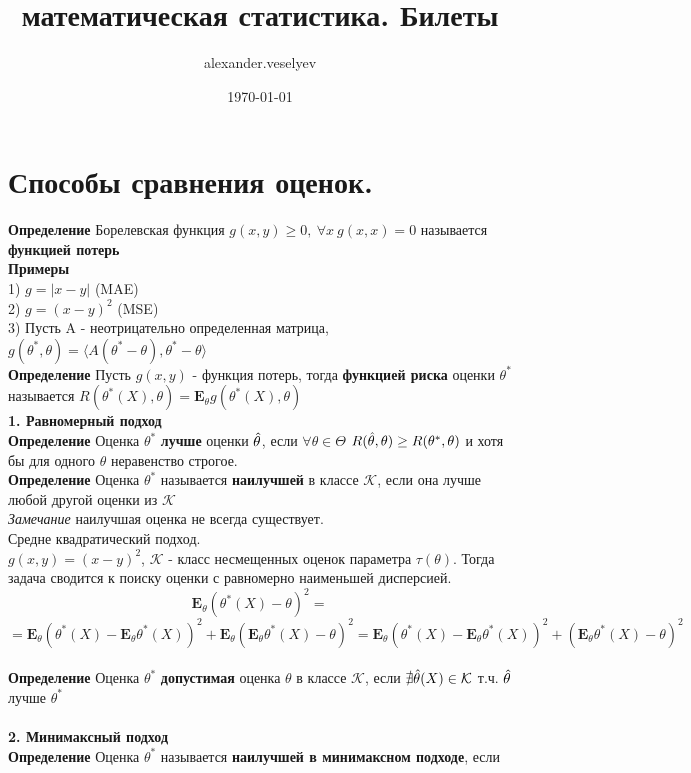 \documentclass[25pt]{article}
\title{математическая статистика. Билеты}
\author{alexander.veselyev }
\date{\today}
\begin{document}
\section{Способы сравнения оценок.}
\textbf{Определение} Борелевская функция $g(x,y) \geq 0,\ \forall x\ g(x,x) = 0$ называется \textbf{функцией потерь}\\
\textbf{Примеры}\\
1) $g = |x - y|$ (MAE)\\
2) $g = (x - y)^2$ (MSE)\\
3) Пусть A - неотрицательно определенная матрица,\\ $g(\theta^*, \theta) = \langle A(\theta^* - \theta), \theta^* - \theta\rangle$\\
\textbf{Определение} Пусть $g(x,y)$ - функция потерь, тогда \textbf{функцией риска} оценки $\theta^*$ называется $R(\theta^*(X), \theta) = \textbf{E}_\theta g(\theta^*(X),\theta)$\\
\textbf{1. Равномерный подход}\\
\textbf{Определение} Оценка $\theta^*$ \textbf{лучше} оценки $\Hat{\theta}$, если $\forall \theta\in\Theta$ $R(\Hat{\theta},\theta) \geq R(\theta^*,\theta)$ и хотя бы для одного $\theta$ неравенство строгое.\\
\textbf{Определение} Оценка $\theta^*$ называется \textbf{наилучшей} в классе $\mathcal{K}$, если она лучше любой другой оценки из $\mathcal{K}$\\
\textit{Замечание} наилучшая оценка не всегда существует.\\
Средне квадратический подход.\\
$g(x,y) = (x - y)^2$, $\mathcal{K}$ - класс несмещенных оценок параметра $\tau(\theta)$. Тогда задача сводится к поиску оценки с равномерно наименьшей дисперсией.\\
$$\textbf{E}_\theta(\theta^*(X)-\theta)^2 =$$ $$= \textbf{E}_\theta(\theta^*(X) - \textbf{E}_\theta\theta^*(X))^2 + \textbf{E}_\theta(\textbf{E}_\theta\theta^*(X) - \theta)^2 = \textbf{E}_\theta(\theta^*(X) - \textbf{E}_\theta\theta^*(X))^2 + (\textbf{E}_\theta\theta^*(X) - \theta)^2$$\\
\textbf{Определение} Оценка $\theta^*$ \textbf{допустимая} оценка $\theta$ в классе $\mathcal{K}$, если $\nexists \Hat{\theta}(X)\in\mathcal{K}$ т.ч. $\Hat{\theta}$ лучше $\theta^*$\\ \\
\textbf{2. Минимаксный подход}\\
\textbf{Определение} Оценка $\theta^*$ называется \textbf{наилучшей в минимаксном подходе}, если 
\end{document}

